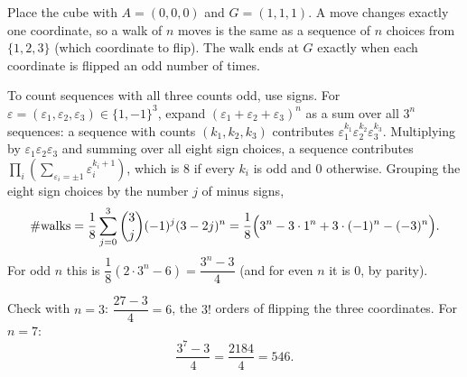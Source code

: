 Place the cube with $A=(0,0,0)$ and $G=(1,1,1)$. A move changes exactly one coordinate, so a walk of $n$ moves is the same as a sequence of $n$ choices from $\{1,2,3\}$ (which coordinate to flip). The walk ends at $G$ exactly when each coordinate is flipped an odd number of times.

To count sequences with all three counts odd, use signs. For $\varepsilon=(\varepsilon_1,\varepsilon_2,\varepsilon_3)\in\{1,-1\}^3$, expand $(\varepsilon_1+\varepsilon_2+\varepsilon_3)^n$ as a sum over all $3^n$ sequences: a sequence with counts $(k_1,k_2,k_3)$ contributes $\varepsilon_1^{k_1}\varepsilon_2^{k_2}\varepsilon_3^{k_3}$. Multiplying by $\varepsilon_1\varepsilon_2\varepsilon_3$ and summing over all eight sign choices, a sequence contributes $\prod_i\left(\sum_{\varepsilon_i=\pm1}\varepsilon_i^{k_i+1}\right)$, which is $8$ if every $k_i$ is odd and $0$ otherwise. Grouping the eight sign choices by the number $j$ of minus signs,
\[
\#\text{walks}=\dfrac{1}{8}\sum_{j=0}^{3}\binom 3j(-1)^j(3-2j)^n=\dfrac{1}{8}\Bigl(3^n-3\cdot1^n+3\cdot(-1)^n-(-3)^n\Bigr).
\]
For odd $n$ this is $\dfrac{1}{8}\left(2\cdot3^n-6\right)=\dfrac{3^n-3}{4}$ (and for even $n$ it is $0$, by parity).

Check with $n=3$: $\dfrac{27-3}{4}=6$, the $3!$ orders of flipping the three coordinates. For $n=7$:
\[
\dfrac{3^7-3}{4}=\dfrac{2184}{4}=\boxed{546}.
\]
